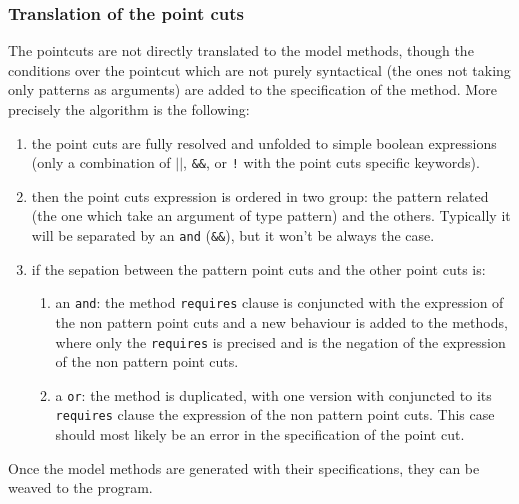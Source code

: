 \subsubsection{Translation of the point cuts}
The pointcuts are not directly translated to the model methods, 
though the conditions over the pointcut which are not purely syntactical (the ones not taking only patterns
as arguments) are added to the specification of the method.  
More precisely the algorithm is the following:
\begin{enumerate}
\item the point cuts are fully resolved and unfolded to simple boolean expressions (only a combination
of {\tt $||$}, {\tt \&\&}, or {\tt !} with the point cuts specific keywords).
\item then the point cuts expression is ordered in two group: the pattern related (the one which take an argument
of type pattern) and the others. Typically it will be separated by an {\tt and} ({\tt \&\&}), 
but it won't be always the case.
\item if the sepation between the pattern point cuts and the other point cuts is:
\begin{enumerate}
\item an {\tt and}: the method {\tt requires} clause is conjuncted with the expression 
of the non pattern point cuts
and a new behaviour is added to the methods, where only the {\tt requires} is precised and 
is the negation of the expression of the non pattern point cuts.
\item a {\tt or}: the method is duplicated, with one version with conjuncted to its {\tt requires} clause 
 the expression of the non pattern point cuts. This case should most likely be an error in the specification
of the point cut.
\end{enumerate}
\end{enumerate}
Once the model methods are generated with their specifications, they can be weaved to the program.
